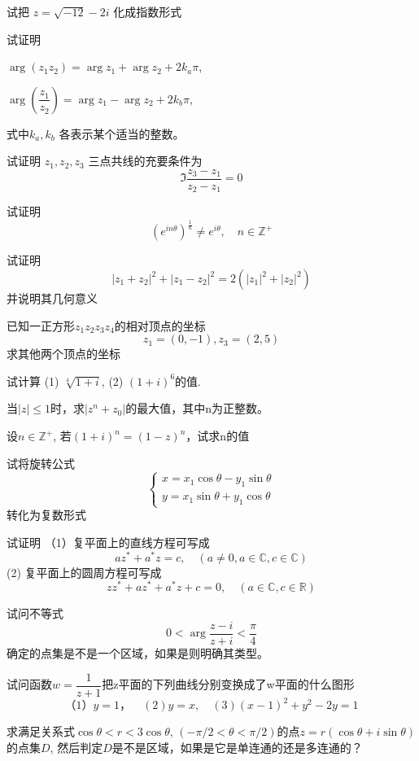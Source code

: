 \begin{Exercises}
    \item 试把 $z= \sqrt{-12} -2 i$ 化成指数形式
    \item 试证明 
    \begin{compactenum}[(1)]
        \item $\arg (z_1 z_2) = \arg z_1 + \arg z_2 + 2k_a \pi $,
        \item $\arg (\dfrac{z_1}{z_2}) = \arg z_1 - \arg z_2 + 2k_b \pi $,
    \end{compactenum}
    式中$k_a, k_b$ 各表示某个适当的整数。
    \item 试证明 $z_1,z_2, z_3$ 三点共线的充要条件为
    \[ \Im \frac{z_3 - z_1}{z_2 -z_1} = 0\]
    \item 试证明 
	\[ (e^{in\theta})^{\frac{1}{n}}  \ne e^{i \theta}, \quad n \in \mathbb{Z}^+\]
	\item 试证明
    \[ \left\vert z_1 + z_2\right\vert ^2  + \left\vert z_1 - z_2\right\vert ^2  = 2 \left( \left\vert z_1 \right\vert ^2 + \left\vert z_2 \right\vert ^2\right) \]
    并说明其几何意义
    \item 已知一正方形$z_1 z_2 z_3 z_4$的相对顶点的坐标
    \[ z_1 = (0,-1), z_3 = (2,5)\]
    求其他两个顶点的坐标
    \item 试计算 (1) $\sqrt[4]{1+i}$, (2) $ (1+i)^6$的值.
    \item 当$|z| \le 1$时，求$|z^n + z_0|$的最大值，其中n为正整数。
    \item 设$n \in \mathbb{Z}^+$, 若$(1+i)^n = (1-z)^n$，试求n的值
    \item 试将旋转公式
    \[ \begin{cases}
        x = x_1 \cos \theta -y_1 \sin \theta \\
        y = x_1 \sin \theta  + y_1 \cos \theta 
    \end{cases}
    \] 转化为复数形式
    \item 试证明 （1）复平面上的直线方程可写成
            \[ a z^* + a^* z = c, \quad (a \ne 0, a \in \mathbb{C}, c \in \mathbb{C})\]
            (2) 复平面上的圆周方程可写成
            \[ zz^* +a z^* + a^* z + c =0, \quad (a \in \mathbb{C}, c \in \mathbb{R})\]
    \item 试问不等式 \[0< \arg \frac{z-i}{z+i} < \frac{\pi}{4}\]
    确定的点集是不是一个区域，如果是则明确其类型。
    \item 试问函数$w = \dfrac{1}{z +1}$把z平面的下列曲线分别变换成了w平面的什么图形
    \[ （1）y=1， \quad (2) y=x, \quad (3) (x-1)^2 +y^2 -2 y =1 \]
    \item 求满足关系式$\cos \theta < r < 3 \cos \theta, \, (-\pi/2 < \theta < \pi /2 )$的点$z = r(\cos \theta + i \sin \theta)$的点集$D$, 然后判定$D$是不是区域，如果是它是单连通的还是多连通的？

\end{Exercises}
